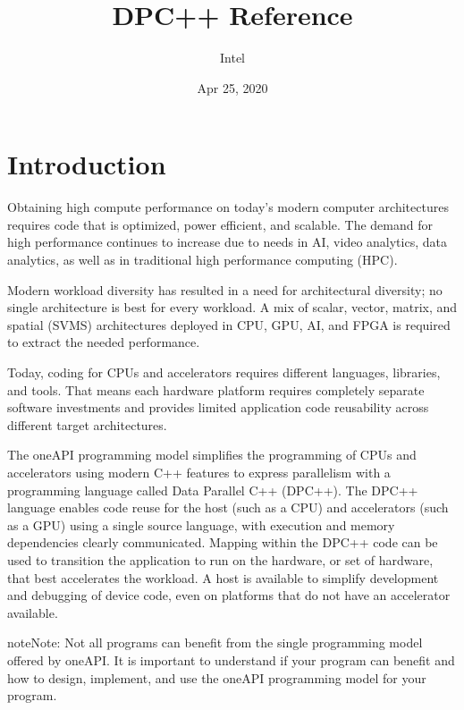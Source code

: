 \documentclass[letterpaper,10pt,english]{sphinxmanual}
\title{DPC++ Reference}
\date{Apr 25, 2020}
\author{Intel}
\begin{document}
\pagestyle{empty}
\sphinxmaketitle
\pagestyle{plain}
\sphinxtableofcontents
\pagestyle{normal}
\label{\detokenize{index::doc}}



\chapter{Introduction}
\label{\detokenize{intro:introduction}}\label{\detokenize{intro:introduction-to-oneapi-programming}}\label{\detokenize{intro::doc}}
Obtaining high compute performance on today’s modern computer
architectures requires code that is optimized, power efficient, and
scalable. The demand for high performance continues to increase due to
needs in AI, video analytics, data analytics, as well as in traditional
high performance computing (HPC).

Modern workload diversity has resulted in a need for architectural
diversity; no single architecture is best for every workload. A mix of
scalar, vector, matrix, and spatial (SVMS) architectures deployed in
CPU, GPU, AI, and FPGA {\hyperref[\detokenize{glossary:term-accelerator}]{}} is required
to extract the needed performance.

Today, coding for CPUs and accelerators requires different languages,
libraries, and tools. That means each hardware platform requires
completely separate software investments and provides limited
application code reusability across different target architectures.

The oneAPI programming model simplifies the programming of CPUs and
accelerators using modern C++ features to express parallelism with a
programming language called Data Parallel C++ (DPC++). The DPC++
language enables code reuse for the host (such as a CPU) and
accelerators (such as a GPU) using a single source language, with
execution and memory dependencies clearly communicated. Mapping within
the DPC++ code can be used to transition the application to run on the
hardware, or set of hardware, that best accelerates the workload. A host
is available to simplify development and debugging of device code, even
on platforms that do not have an accelerator available.

\begin{sphinxadmonition}{note}{Note:}
Not all programs can benefit from the single programming model
offered by oneAPI. It is important to understand if your program can
benefit and how to design, implement, and use the oneAPI programming
model for your program.
\end{sphinxadmonition}
\end{document}
